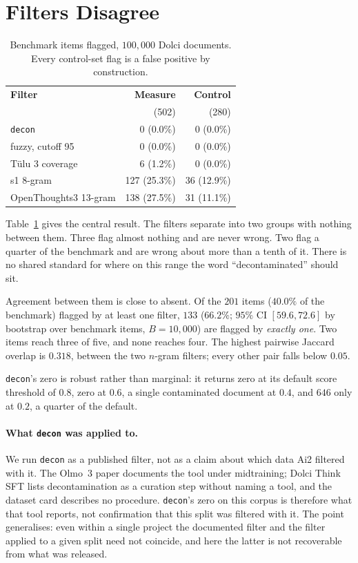 \documentclass[11pt]{article}
\begin{document}
\section{Filters Disagree}
\label{sec:disagree}

\begin{table}[t]
\centering
\small
\setlength{\tabcolsep}{3.5pt}
\begin{tabular}{lrr}
\toprule
\textbf{Filter} & \textbf{Measure} & \textbf{Control} \\
 & (502) & (280) \\
\midrule
\texttt{decon} & 0 (0.0\%) & 0 (0.0\%) \\
fuzzy, cutoff 95 & 0 (0.0\%) & 0 (0.0\%) \\
T\"{u}lu 3 coverage & 6 (1.2\%) & 0 (0.0\%) \\
s1 8-gram & 127 (25.3\%) & 36 (12.9\%) \\
OpenThoughts3 13-gram & 138 (27.5\%) & 31 (11.1\%) \\
\bottomrule
\end{tabular}
\caption{Benchmark items flagged, $100{,}000$ Dolci documents. Every control-set
flag is a false positive by construction.}
\label{tab:main}
\end{table}

Table~\ref{tab:main} gives the central result. The filters separate into two
groups with nothing between them. Three flag almost nothing and are never wrong.
Two flag a quarter of the benchmark and are wrong about more than a tenth of it.
There is no shared standard for where on this range the word ``decontaminated''
should sit.

Agreement between them is close to absent. Of the $201$ items ($40.0\%$ of the
benchmark) flagged by at least one filter, $133$ ($66.2\%$; $95\%$ CI
$[59.6, 72.6]$ by bootstrap over benchmark items, $B{=}10{,}000$) are flagged by
\emph{exactly one}. Two items reach three of five, and none reaches four. The
highest pairwise Jaccard overlap is $0.318$, between the two $n$-gram filters;
every other pair falls below $0.05$.

\texttt{decon}'s zero is robust rather than marginal: it returns zero at its
default score threshold of $0.8$, zero at $0.6$, a single contaminated document at
$0.4$, and $646$ only at $0.2$, a quarter of the default.

\paragraph{What \texttt{decon} was applied to.} We run \texttt{decon} as a
published filter, not as a claim about which data Ai2 filtered with it. The Olmo~3
paper documents the tool under midtraining; Dolci Think SFT lists decontamination
as a curation step without naming a tool, and the dataset card describes no
procedure. \texttt{decon}'s zero on this corpus is therefore what that tool
reports, not confirmation that this split was filtered with it. The point
generalises: even within a single project the documented filter and the filter
applied to a given split need not coincide, and here the latter is not recoverable
from what was released.
\end{document}
